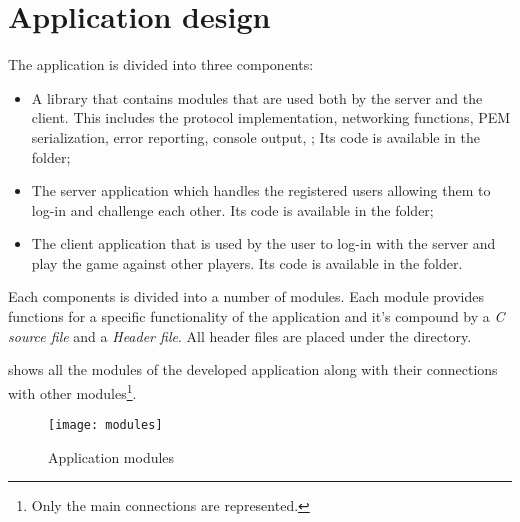 \chapter{Application design}\label{ch:design}

The application is divided into three components:
\begin{itemize}
	\item[\standout{Common}] A library that contains modules that are used
		both by the server and the client. This includes the protocol
		implementation, networking functions, PEM serialization, error
		reporting, console output, \etc; Its code is available in the
		 folder;
	\item[\standout{Server}] The server application which handles the
		registered users allowing them to log-in and challenge each
		other. Its code is available in the  folder;
	\item[\standout{Client}] The client application that is used by the user
		to log-in with the server and play the game against other
		players. Its code is available in the  folder.
\end{itemize}

Each components is divided into a number of modules. Each module provides
functions for a specific functionality of the application and it's compound by a
\emph{C source file} and a \emph{Header file}. All header files are placed under
the  directory.

 shows all the modules of the developed application along
with their connections with other modules\footnote{Only the main connections are
represented.}.

\begin{figure}[htb]
	\texttt{[image: modules]}
	\caption{Application modules}\label{fig:modules}
\end{figure}


